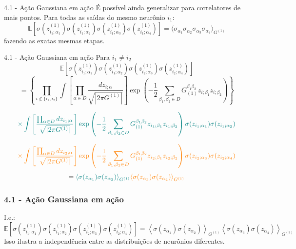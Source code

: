 \documentclass{beamer}
\begin{document}
\begin{frame}{4.1 - Ação Gaussiana em ação}
    É possível ainda generalizar para correlatores de mais pontos. Para todas as saídas do mesmo neurônio $i_1$:
    $$
    \mathbb{E} \left[ \sigma( z^{(1)}_{i_1;\alpha_1} ) \sigma( z^{(1)}_{i_1;\alpha_2})\sigma( z^{(1)}_{i_1;\alpha_3}) \sigma( z^{(1)}_{i_1;\alpha_4}) \right] = \langle \sigma_{\alpha_1} \sigma_{\alpha_2}\sigma_{\alpha_3}\sigma_{\alpha_4} \rangle_{G^{(1)}}
    $$
    fazendo as exatas mesmas etapas.
\end{frame}

\begin{frame}{4.1 - Ação Gaussiana em ação}
    Para $i_1\neq i_2$
    \tiny
    $$
    \mathbb{E} \left[
    \sigma\left( z^{(1)}_{i_1;\alpha_1} \right)
    \sigma\left( z^{(1)}_{i_1;\alpha_2} \right)
    \sigma\left( z^{(1)}_{i_2;\alpha_3} \right)
    \sigma\left( z^{(1)}_{i_2;\alpha_4} \right)
    \right]
    $$
    \pause
    $$
    = \left\{ 
    \prod_{i \notin \{i_1, i_2\}} 
    \displaystyle \int \left[ \prod_{\alpha \in D} \frac{dz_{i;\alpha}}{\sqrt{|2\pi G^{(1)}|}} \right]
    \exp\left( -\frac{1}{2} \sum_{\beta_1, \beta_2 \in D} G_{(1)}^{\beta_1 \beta_2} z_{i;\beta_1} z_{i;\beta_2} \right)
    \right\}
    $$

    $$
    \textcolor{teal}{\times \displaystyle \int \left[ \frac{\prod_{\alpha \in D} dz_{i_1;\alpha}}{\sqrt{|2\pi G^{(1)}|}} \right]
    \exp\left( -\frac{1}{2} \sum_{\beta_1, \beta_2 \in D} G_{(1)}^{\beta_1 \beta_2} z_{i_1;\beta_1} z_{i_1;\beta_2} \right)
    \sigma(z_{i_1;\alpha_1}) \sigma(z_{i_1;\alpha_2})}
    $$

    $$
    \textcolor{orange}{\times \displaystyle \int \left[ \frac{\prod_{\alpha \in D} dz_{i_2;\alpha}}{\sqrt{|2\pi G^{(1)}|}} \right]
    \exp\left( -\frac{1}{2} \sum_{\beta_1, \beta_2 \in D} G_{(1)}^{\beta_1 \beta_2} z_{i_2;\beta_1} z_{i_2;\beta_2} \right)
    \sigma(z_{i_2;\alpha_3}) \sigma(z_{i_2;\alpha_4})}
    $$
    \pause 
    $$
    = \textcolor{teal}{\left\langle \sigma(z_{\alpha_1}) \sigma(z_{\alpha_2}) \right\rangle_{G^{(1)}}}
    \textcolor{orange}{\left\langle \sigma(z_{\alpha_3}) \sigma(z_{\alpha_4}) \right\rangle_{G^{(1)}}}
    $$


\end{frame}

\begin{frame}
    \frametitle{4.1 - Ação Gaussiana em ação}

    I.e.:
    \tiny
    $$
    \mathbb{E} \left[
    \sigma\left( z^{(1)}_{i_1;\alpha_1} \right)
    \sigma\left( z^{(1)}_{i_1;\alpha_2} \right)
    \sigma\left( z^{(1)}_{i_2;\alpha_3} \right)
    \sigma\left( z^{(1)}_{i_2;\alpha_4} \right)
    \right]
    = \left\langle \sigma(z_{\alpha_1}) \sigma(z_{\alpha_2}) \right\rangle_{G^{(1)}}
    \left\langle \sigma(z_{\alpha_3}) \sigma(z_{\alpha_4}) \right\rangle_{G^{(1)}}
    $$
    \normalsize
    Isso ilustra a independência entre as distribuições de neurônios diferentes.

\end{frame}
\end{document}
